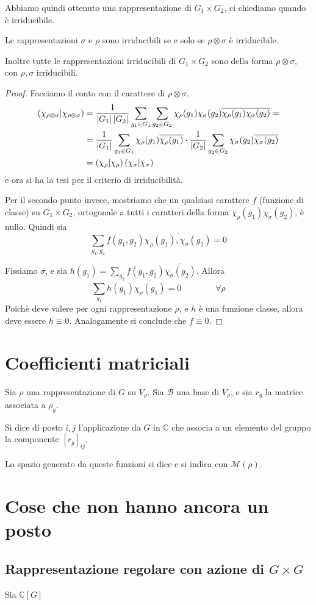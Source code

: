 \documentclass[a4paper,10pt,oneside]{math_article}
\newcommand{\herm}[2]{\left(#1 | #2\right)}
\newcommand{\tensor}{\otimes}
\let\conj\overline
\begin{document}
   Abbiamo quindi ottenuto una rappresentazione di $G_1\times G_2$, ci chiediamo quando è irriducibile. 
   \begin{myprop}
    Le rappresentazioni $\sigma$ e $\rho$ sono irriducibili se e solo se $\rho \tensor \sigma$ è irriducibile.
    
    Inoltre tutte le rappresentazioni irriducibili di $G_1\times G_2$ sono della forma $\rho \tensor \sigma$, con $\rho,\sigma$ irriducibili.
   \end{myprop}
   \begin{proof}
    Facciamo il conto con il carattere di $\rho \tensor \sigma$.
    \begin{align*}
     \herm{\chi_{\rho\tensor\sigma}}{\chi_{\rho\tensor\sigma}} &= \frac1{\abs {G_1}\abs{G_2}}\sum_{g_1 \in G_1}\sum_{g_2\in G_2} \chi_\rho(g_1)\chi_\sigma(g_2)\conj{\chi_\rho(g_1)\chi_\sigma(g_2)} = \\
     &= \frac1{\abs {G_1}}\sum_{g_1 \in G_1} \chi_\rho(g_1)\conj{\chi_\rho(g_1)}\cdot\frac1{\abs {G_2}}\sum_{g_2\in G_2}\chi_\sigma(g_2)\conj{\chi_\sigma(g_2)}\\
     &= \herm{\chi_\rho}{\chi_\rho}\herm{\chi_\sigma}{\chi_\sigma}
    \end{align*}
    e ora si ha la tesi per il criterio di irriducibilità.
    
    Per il secondo punto invece, mostriamo che un qualsiasi carattere $f$ (funzione di classe) su $G_1\times G_2$, ortogonale a tutti i caratteri della forma $\chi_\rho(g_1)\chi_\sigma(g_2)$, è nullo. Quindi sia
    \[
     \sum_{g_1,g_2} f(g_1,g_2) \conj{\chi_\rho(g_1),\chi_\sigma(g_2)}=0
    \]
    
    Fissiamo $\sigma$, e sia $h(g_1)=\sum_{g_2} f(g_1,g_2)\conj{\chi_\sigma(g_2)}$. Allora
    \[
     \sum_{g_1}h(g_1)\conj{\chi_\rho(g_1)}=0 \qquad\qquad \forall \rho
    \]
    Poichè deve valere per ogni rappresentazione $\rho$, e $h$ è una funzione classe, allora deve essere $h\equiv 0$. Analogamente si conclude che $f \equiv 0$.


   \end{proof}

  \section{Coefficienti matriciali}
    \begin{mydef}
     Sia $\rho$ una rappresentazione di $G$ su $V_\rho$. Sia $\mathcal B$ una base di $V_\rho$, e sia $r_g$ la matrice associata a $\rho_g$.
     
     Si dice  di posto $i,j$ l'applicazione da $G$ in $\mathbb C$ che associa a un elemento del gruppo la componente $[r_g]_{ij}$.
     
     Lo spazio generato da queste funzioni si dice  e si indica con $\mathcal M(\rho)$.
    \end{mydef}

 
  \section{Cose che non hanno ancora un posto}
   \subsection{Rappresentazione regolare con azione di $G\times G$}
   Sia $\mathbb C[G]$ 
 
\end{document}
